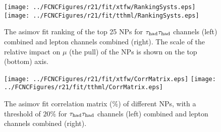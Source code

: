 \begin{figure}[htb]
\centering
\texttt{[image: ../FCNCFigures/r21/fit/xtfw/RankingSysts.eps]}
\texttt{[image: ../FCNCFigures/r21/fit/tthml/RankingSysts.eps]}
\caption{ The asimov fit ranking of the top 25 NPs for $\tau_\text{had}{}\tau_\text{had}$ channels (left) combined and lepton channels combined (right). The scale of the relative impact on $\mu$ (the pull) of the NPs is shown on the top (bottom) axis.}
\label{fig:fcnc_rank_data}
\end{figure}

\begin{figure}[htb]
\centering
\texttt{[image: ../FCNCFigures/r21/fit/xtfw/CorrMatrix.eps]}
\texttt{[image: ../FCNCFigures/r21/fit/tthml/CorrMatrix.eps]}
\caption{ The asimov fit correlation matrix ($\%$) of different NPs, with a threshold of $20\%$ for $\tau_\text{had}{}\tau_\text{had}$ channels (left) combined and lepton channels combined (right). }
\label{fig:fcnc_correl_data}
\end{figure}

